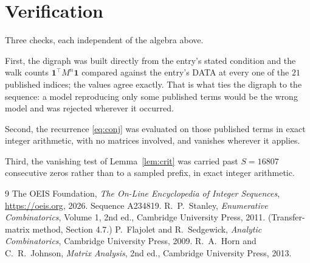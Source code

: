 \documentclass[11pt,a4paper]{article}
\theoremstyle{plain}
\theoremstyle{definition}
\begin{document}
\section{Verification}

Three checks, each independent of the algebra above.

First, the digraph was built directly from the entry's stated condition and the walk counts
$\mathbf{1}^{\!\top}M^{n}\mathbf{1}$ compared against the entry's DATA at every one of
the $21$ published indices; the values agree exactly. That is what ties the digraph to
the sequence: a model reproducing only some published terms would be the wrong model and
was rejected wherever it occurred.

Second, the recurrence \eqref{eq:conj} was evaluated on those published terms in exact
integer arithmetic, with no matrices involved, and vanishes wherever it applies.

Third, the vanishing test of Lemma~\ref{lem:crit} was carried past $S=16807$ consecutive
zeros rather than to a sampled prefix, in exact integer arithmetic.

\begin{thebibliography}{9}
 The OEIS Foundation, \emph{The On-Line Encyclopedia of Integer
Sequences}, \url{https://oeis.org}, 2026. Sequence A234819.
 R.~P.~Stanley, \emph{Enumerative Combinatorics}, Volume 1, 2nd ed.,
Cambridge University Press, 2011. (Transfer-matrix method, Section 4.7.)
 P.~Flajolet and R.~Sedgewick, \emph{Analytic Combinatorics}, Cambridge
University Press, 2009.
 R.~A.~Horn and C.~R.~Johnson, \emph{Matrix Analysis}, 2nd ed., Cambridge
University Press, 2013.
\end{thebibliography}
\end{document}
